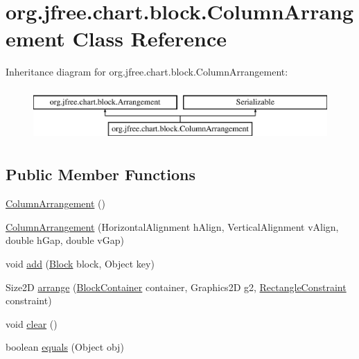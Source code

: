 \hypertarget{classorg_1_1jfree_1_1chart_1_1block_1_1_column_arrangement}{}\section{org.\+jfree.\+chart.\+block.\+Column\+Arrangement Class Reference}
\label{classorg_1_1jfree_1_1chart_1_1block_1_1_column_arrangement}
Inheritance diagram for org.\+jfree.\+chart.\+block.\+Column\+Arrangement\+:\begin{figure}[H]
\begin{center}
\leavevmode
\includegraphics[height=2.000000cm]{classorg_1_1jfree_1_1chart_1_1block_1_1_column_arrangement}
\end{center}
\end{figure}
\subsection*{Public Member Functions}
\begin{DoxyCompactItemize}
\item 
\mbox{\hyperlink{classorg_1_1jfree_1_1chart_1_1block_1_1_column_arrangement_a9a71658d516a78ad59859d778425b6f3}{Column\+Arrangement}} ()
\item 
\mbox{\hyperlink{classorg_1_1jfree_1_1chart_1_1block_1_1_column_arrangement_ad702fed1431e40d07444905950171c73}{Column\+Arrangement}} (Horizontal\+Alignment h\+Align, Vertical\+Alignment v\+Align, double h\+Gap, double v\+Gap)
\item 
void \mbox{\hyperlink{classorg_1_1jfree_1_1chart_1_1block_1_1_column_arrangement_aaf6f65ef1134e5ce76c842c49a047294}{add}} (\mbox{\hyperlink{interfaceorg_1_1jfree_1_1chart_1_1block_1_1_block}{Block}} block, Object key)
\item 
Size2D \mbox{\hyperlink{classorg_1_1jfree_1_1chart_1_1block_1_1_column_arrangement_ae2f54a850b6d327b59631e746dc55236}{arrange}} (\mbox{\hyperlink{classorg_1_1jfree_1_1chart_1_1block_1_1_block_container}{Block\+Container}} container, Graphics2D g2, \mbox{\hyperlink{classorg_1_1jfree_1_1chart_1_1block_1_1_rectangle_constraint}{Rectangle\+Constraint}} constraint)
\item 
void \mbox{\hyperlink{classorg_1_1jfree_1_1chart_1_1block_1_1_column_arrangement_a5da939ad032092f20b3ed15922d171e3}{clear}} ()
\item 
boolean \mbox{\hyperlink{classorg_1_1jfree_1_1chart_1_1block_1_1_column_arrangement_a1e7ba2d07657fe36afdba577ad549627}{equals}} (Object obj)
\end{DoxyCompactItemize}
